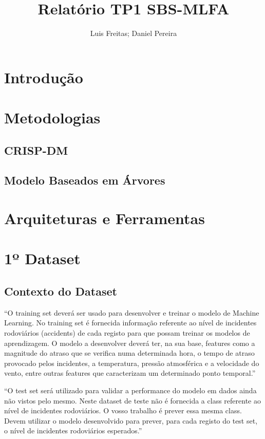\documentclass[a4paper,10pt]{article}
\title{Relatório TP1 SBS-MLFA}
\author{Luis Freitas; Daniel Pereira}
\begin{document}
\maketitle

\begin{abstract}

\end{abstract}

\section{Introdução}
\newpage
\section{Metodologias}
\subsection{CRISP-DM}
\subsection{Modelo Baseados em Árvores}
\newpage



\section{Arquiteturas e Ferramentas}
\newpage

\section{1º Dataset}

\newpage


\subsection{Contexto do Dataset}
“O training set deverá ser usado para desenvolver e treinar o modelo de Machine Learning. No training set é fornecida informação referente ao nível de incidentes rodoviários (accidents) de cada registo para que possam treinar os modelos de aprendizagem. O modelo a desenvolver deverá ter, na sua base, features como a magnitude do atraso que se verifica numa determinada hora, o tempo de atraso provocado pelos incidentes, a temperatura, pressão atmosférica e a velocidade do vento, entre outras features que caracterizam um determinado ponto temporal.”

“O test set será utilizado para validar a performance do modelo em dados ainda não vistos pelo mesmo. Neste dataset de teste não é fornecida a class referente ao nível de incidentes rodoviários. O vosso trabalho é prever essa mesma class. Devem utilizar o modelo desenvolvido para prever, para cada registo do test set, o nível de incidentes rodoviários esperados.”
\end{document}
